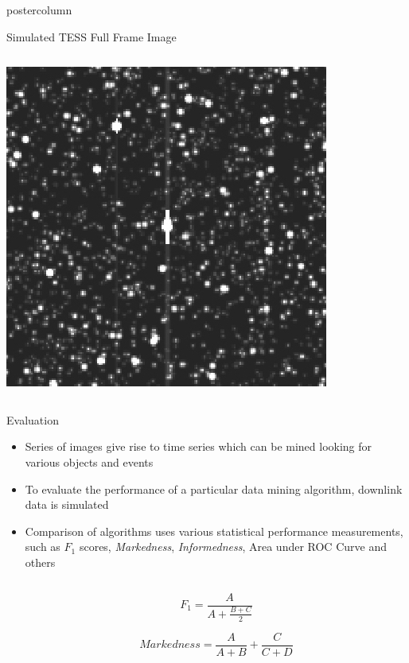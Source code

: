\documentclass[final,hyperref={pdfpagelabels=false}]{beamer}
\begin{document}
\begin{frame}
\begin{columns}
\begin{column}{.49\textwidth}
\begin{beamercolorbox}[center,wd=\textwidth]{postercolumn}
\begin{minipage}[T]{.95\textwidth}
{\begin{block}{Simulated TESS Full Frame Image}
\begin{columns}
\begin{column}{.38\textwidth}
                  \includegraphics[width=0.80\linewidth]{figures/ffi_simulation.jpg}
		\end{column}
	       \end{columns}
            \end{block}
            \vspace{1cm}
            \begin{block}{Evaluation}
            	\begin{itemize}
			\item Series of images give rise to time series which can be mined looking for various objects and events
			\item To evaluate the performance of a particular data mining algorithm, downlink data is simulated 
			\item Comparison of algorithms uses various statistical performance measurements, such as $F_1$ scores, \emph{Markedness}, \emph{Informedness}, Area under ROC Curve and others
				\begin{columns}
                			\begin{column}{.30\textwidth}
			        $$ F_1 = \frac{A}{A + \frac{B + C}{2}} $$
			       
			       $$ Markedness = \frac{A}{A + B} + \frac{C}{C+D}$$
			       

\end{column}
\end{columns}
\end{itemize}
\end{block}}
\end{minipage}
\end{beamercolorbox}
\end{column}
\end{columns}
\end{frame}
\end{document}
